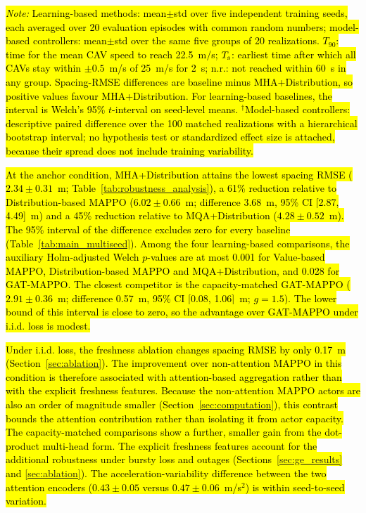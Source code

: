 \documentclass{ieeeaccess}
\begin{document}
\begin{table}[htbp]
\vspace{0.2cm}
{\raggedright
\footnotesize
\hl{\textit{Note:} Learning-based methods: mean$\pm$std over five independent training seeds, each averaged over 20 evaluation episodes with common random numbers; model-based controllers: mean$\pm$std over the same five groups of 20 realizations. $T_{90}$: time for the mean CAV speed to reach 22.5~m/s; $T_{\rm s}$: earliest time after which all CAVs stay within $\pm0.5$~m/s of 25~m/s for 2~s; n.r.: not reached within 60~s in any group. Spacing-RMSE differences are baseline minus MHA+Distribution, so positive values favour MHA+Distribution. For learning-based baselines, the interval is Welch's 95\% $t$-interval on seed-level means. $^{\dagger}$Model-based controllers: descriptive paired difference over the 100 matched realizations with a hierarchical bootstrap interval; no hypothesis test or standardized effect size is attached, because their spread does not include training variability.}
\par}
\end{table}

\hl{At the anchor condition, MHA+Distribution attains the lowest spacing RMSE ($2.34\pm0.31$~m; Table~\ref{tab:robustness_analysis}), a 61\% reduction relative to Distribution-based MAPPO ($6.02\pm0.66$~m; difference 3.68~m, 95\% CI [2.87, 4.49]~m) and a 45\% reduction relative to MQA+Distribution ($4.28\pm0.52$~m). The 95\% interval of the difference excludes zero for every baseline (Table~\ref{tab:main_multiseed}). Among the four learning-based comparisons, the auxiliary Holm-adjusted Welch $p$-values are at most 0.001 for Value-based MAPPO, Distribution-based MAPPO and MQA+Distribution, and 0.028 for GAT-MAPPO. The closest competitor is the capacity-matched GAT-MAPPO ($2.91\pm0.36$~m; difference 0.57~m, 95\% CI [0.08, 1.06]~m; $g=1.5$). The lower bound of this interval is close to zero, so the advantage over GAT-MAPPO under i.i.d. loss is modest.} %

\hl{Under i.i.d. loss, the freshness ablation changes spacing RMSE by only 0.17~m (Section~\ref{sec:ablation}). The improvement over non-attention MAPPO in this condition is therefore associated with attention-based aggregation rather than with the explicit freshness features. Because the non-attention MAPPO actors are also an order of magnitude smaller (Section~\ref{sec:computation}), this contrast bounds the attention contribution rather than isolating it from actor capacity. The capacity-matched comparisons show a further, smaller gain from the dot-product multi-head form. The explicit freshness features account for the additional robustness under bursty loss and outages (Sections~\ref{sec:ge_results} and \ref{sec:ablation}). The acceleration-variability difference between the two attention encoders ($0.43\pm0.05$ versus $0.47\pm0.06$~m/s$^2$) is within seed-to-seed variation.} %
\end{document}
